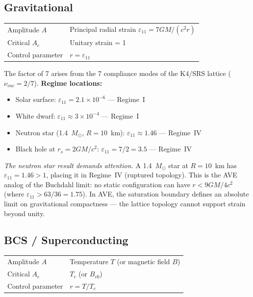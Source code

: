 \subsection{Gravitational}

\begin{center}
\begin{tabular}{ll}
\toprule
Amplitude $A$ & Principal radial strain $\varepsilon_{11} = 7GM/(c^2 r)$ \\
Critical $A_c$ & Unitary strain = 1 \\
Control parameter & $r = \varepsilon_{11}$ \\
\bottomrule
\end{tabular}
\end{center}

\noindent The factor of 7 arises from the 7 compliance modes of the K4/SRS lattice ($\nu_{vac} = 2/7$). \textbf{Regime locations:}
\begin{itemize}
    \item Solar surface: $\varepsilon_{11} = 2.1 \times 10^{-6}$ --- Regime~I
    \item White dwarf: $\varepsilon_{11} \approx 3 \times 10^{-4}$ --- Regime~I
    \item Neutron star (1.4~$M_\odot$, $R = 10$~km): $\varepsilon_{11} \approx 1.46$ --- Regime~IV
    \item Black hole at $r_s = 2GM/c^2$: $\varepsilon_{11} = 7/2 = 3.5$ --- Regime~IV
\end{itemize}

\noindent \textit{The neutron star result demands attention.} A 1.4~$M_\odot$ star at $R = 10$~km has $\varepsilon_{11} = 1.46 > 1$, placing it in Regime~IV (ruptured topology). This is the AVE analog of the Buchdahl limit: no static configuration can have $r < 9GM/4c^2$ (where $\varepsilon_{11} > 63/36 = 1.75$). In AVE, the saturation boundary defines an absolute limit on gravitational compactness --- the lattice topology cannot support strain beyond unity.

\subsection{BCS / Superconducting}

\begin{center}
\begin{tabular}{ll}
\toprule
Amplitude $A$ & Temperature $T$ (or magnetic field $B$) \\
Critical $A_c$ & $T_c$ (or $B_{c0}$) \\
Control parameter & $r = T/T_c$ \\
\bottomrule
\end{tabular}
\end{center}

